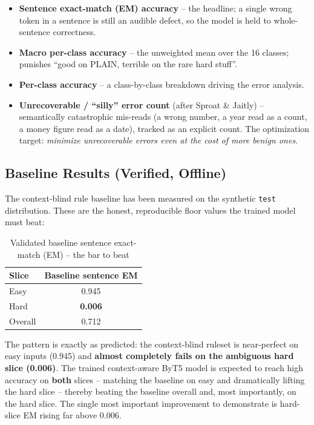 \documentclass[12pt,a4paper]{article}
\begin{document}
\begin{itemize}\setlength\itemsep{0.15em}
  \item \textbf{Sentence exact-match (EM) accuracy} -- the headline; a single wrong token in a sentence is still an audible defect, so the model is held to whole-sentence correctness.
  \item \textbf{Macro per-class accuracy} -- the unweighted mean over the 16 classes; punishes ``good on PLAIN, terrible on the rare hard stuff''.
  \item \textbf{Per-class accuracy} -- a class-by-class breakdown driving the error analysis.
  \item \textbf{Unrecoverable / ``silly'' error count} (after Sproat \& Jaitly) -- semantically catastrophic mis-reads (a wrong number, a year read as a count, a money figure read as a date), tracked as an explicit count. The optimization target: \emph{minimize unrecoverable errors even at the cost of more benign ones}.
\end{itemize}

\subsection{Baseline Results (Verified, Offline)}

The context-blind rule baseline has been measured on the synthetic \texttt{test} distribution. These are the honest, reproducible floor values the trained model must beat:

\begin{table}[H]
\centering
\caption{Validated baseline sentence exact-match (EM) -- the bar to beat}
\begin{tabular}{lc}
\toprule
\textbf{Slice} & \textbf{Baseline sentence EM} \\
\midrule
Easy & 0.945 \\
Hard & \textbf{0.006} \\
Overall & 0.712 \\
\bottomrule
\end{tabular}
\end{table}

The pattern is exactly as predicted: the context-blind ruleset is near-perfect on easy inputs (0.945) and \textbf{almost completely fails on the ambiguous hard slice (0.006)}. The trained context-aware ByT5 model is expected to reach high accuracy on \textbf{both} slices -- matching the baseline on easy and dramatically lifting the hard slice -- thereby beating the baseline overall and, most importantly, on the hard slice. The single most important improvement to demonstrate is hard-slice EM rising far above 0.006.
\end{document}
